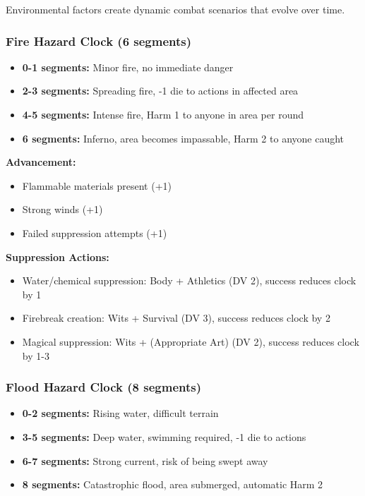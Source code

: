 Environmental factors create dynamic combat scenarios that evolve over time.

\subsubsection{Fire Hazard Clock (6 segments)}

\begin{itemize}[leftmargin=*]
    \item \textbf{0-1 segments:} Minor fire, no immediate danger
    \item \textbf{2-3 segments:} Spreading fire, -1 die to actions in affected area
    \item \textbf{4-5 segments:} Intense fire, Harm 1 to anyone in area per round
    \item \textbf{6 segments:} Inferno, area becomes impassable, Harm 2 to anyone caught
\end{itemize}

\textbf{Advancement:}
\begin{itemize}[leftmargin=*]
    \item Flammable materials present (+1)
    \item Strong winds (+1)
    \item Failed suppression attempts (+1)
\end{itemize}

\textbf{Suppression Actions:}
\begin{itemize}[leftmargin=*]
    \item Water/chemical suppression: Body + Athletics (DV 2), success reduces clock by 1
    \item Firebreak creation: Wits + Survival (DV 3), success reduces clock by 2
    \item Magical suppression: Wits + (Appropriate Art) (DV 2), success reduces clock by 1-3
\end{itemize}

\subsubsection{Flood Hazard Clock (8 segments)}

\begin{itemize}[leftmargin=*]
    \item \textbf{0-2 segments:} Rising water, difficult terrain
    \item \textbf{3-5 segments:} Deep water, swimming required, -1 die to actions
    \item \textbf{6-7 segments:} Strong current, risk of being swept away
    \item \textbf{8 segments:} Catastrophic flood, area submerged, automatic Harm 2
\end{itemize}

